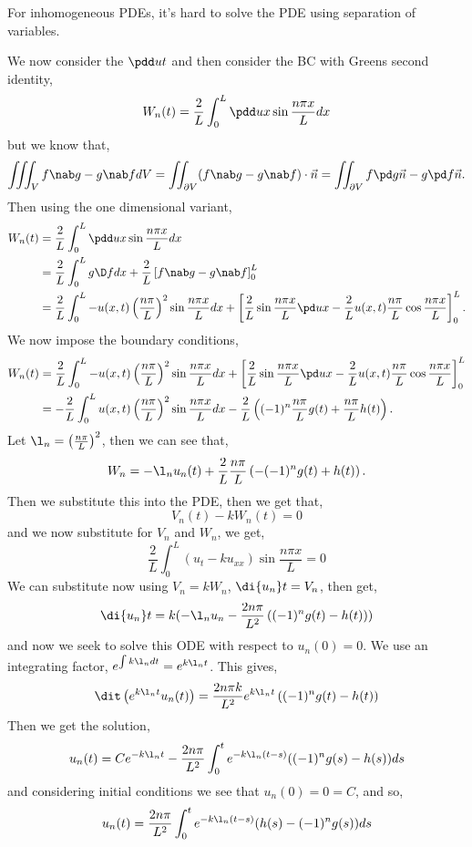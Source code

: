 
\noindent
For inhomogeneous PDEs, it's hard to solve the PDE using separation of variables.

We now consider the $\pdd u t$ and then consider the BC with Greens second identity,
$$ W_n(t) = \frac{2}{L}\int_0^L \pdd u x \sin \frac{n\pi x}{L}dx $$
but we know that,
$$ \iiint_V f\nab g - g\nab f dV = \iint_{\partial V} (f\nab g - g\nab f) \cdot \vec n = \iint_{\partial V} f \pd g {\vec n} - g\pd f {\vec n}.$$
Then using the one dimensional variant,
\begin{align*}
  W_n(t) &= \frac{2}{L}\int_0^L \pdd u x \sin \frac{n\pi x}{L}dx \\
  &= \frac{2}{L}\int_0^L g\D f dx + \frac{2}{L}\left[ f\nab g - g\nab f \right]_0^L \\
  &= \frac{2}{L}\int_0^L -u(x, t)\left( \frac{n\pi}{L}\right)^2 \sin \frac{n\pi x}{L}dx + \left[\frac{2}{L}\sin \frac{n\pi x}{L}\pd u x - \frac{2}{L}u(x, t)\frac{n\pi}{L}\cos \frac{n\pi x}{L}\right]_0^L.
\end{align*}
\noindent
We now impose the boundary conditions,
\begin{align*}
  W_n(t) &= \frac{2}{L}\int_0^L -u(x, t)\left( \frac{n\pi}{L}\right)^2 \sin \frac{n\pi x}{L}dx + \left[\frac{2}{L}\sin \frac{n\pi x}{L}\pd u x - \frac{2}{L}u(x, t)\frac{n\pi}{L}\cos \frac{n\pi x}{L}\right]_0^L \\
  &= -\frac{2}{L}\int_0^L u(x, t)\left( \frac{n\pi}{L}\right)^2 \sin \frac{n\pi x}{L}dx - \frac{2}{L}\left((-1)^n \frac{n\pi}{L} g(t) + \frac{n\pi}{L}h(t) \right).
\end{align*}
Let $\l_n = \left( \frac{n\pi}{L} \right)^2$, then we can see that,
$$ W_n = - \l_n u_n(t) + \frac{2}{L}\frac{n\pi}{L}\left( -(-1)^n g(t) + h(t) \right). $$
Then we substitute this into the PDE, then we get that,
$$ V_n(t) - kW_n(t) = 0 $$
and we now substitute for $V_n$ and $W_n$, we get,
$$ \frac{2}{L}\int_0^L (u_t - ku_{xx})\sin \frac{n\pi x}{L} = 0 $$
We can substitute now using $V_n = kW_n$, $\di {u_n} t = V_n$, then get,
$$ \di {u_n} t = k(-\l_n u_n - \frac{2n\pi}{L^2}\left( (-1)^n g(t) - h(t) \right)) $$
and now we seek to solve this ODE with respect to $u_n(0) = 0$. We use an integrating factor, $e^{\int k\l_n dt} = e^{k\l_n t}$. This gives,
$$ \dit \left( e^{k\l_n t}u_n(t) \right) = \frac{2n\pi k}{L^2}e^{k\l_n t}\left( (-1)^n g(t) - h(t) \right) $$
Then we get the solution,
$$ u_n(t) = Ce^{-k\l_n t} - \frac{2n\pi}{L^2}\int_0^t e^{-k\l_n (t - s)} ((-1)^n g(s) - h(s)) ds $$
and considering initial conditions we see that $u_n(0) = 0 = C$, and so,
$$ u_n(t) = \frac{2n\pi}{L^2}\int_0^t e^{-k\l_n (t - s)} (h(s) - (-1)^n g(s)) ds $$

